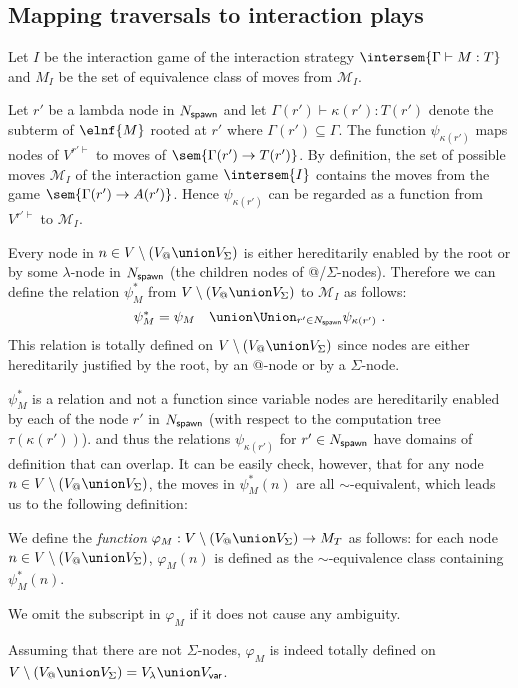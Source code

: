 \subsection{Mapping traversals to interaction plays}

    Let $I$ be the interaction game of the interaction strategy $\intersem{\Gamma \vdash M : T}$ and
    $M_I$ be the set of equivalence class of moves from $\mathcal{M}_I$.

    Let $r'$ be a lambda node in $N_{\sf spawn}$ and let $\Gamma(r') \vdash \kappa(r') : T(r')$ denote the subterm of $\elnf{M}$ rooted at $r'$ where $\Gamma(r')\subseteq \Gamma$.
    The function $\psi_{\kappa(r')}$ maps nodes of $V^{r'\vdash}$
    to moves of $\sem{\Gamma(r') \rightarrow T(r')}$. By definition,
    the set of possible moves $\mathcal{M}_I$ of the interaction game $\intersem{I}$ contains the
    moves from the game $\sem{\Gamma(r') \rightarrow A(r')}$. Hence $\psi_{\kappa(r')}$ can be regarded as a function from $V^{r'\vdash}$ to $\mathcal{M}_I$.

    Every node in $n \in V\setminus (V_@ \union V_\Sigma)$ is either hereditarily enabled by the root or by some $\lambda$-node in $N_{\sf spawn}$ (the children nodes of @/$\Sigma$-nodes). Therefore we can define the relation $\psi^*_M$ from
    $V\setminus (V_@ \union V_\Sigma)$ to $\mathcal{M}_I$ as follows:
    $$ \psi^*_M = \psi_{M} \quad \union \Union_{r' \in N_{\sf spawn}} \psi_{\kappa(r')} \ .$$
    This relation is totally defined on $V\setminus (V_@ \union V_\Sigma)$ since nodes are either hereditarily justified by the root, by an @-node or by a $\Sigma$-node.

    $\psi^*_M$ is a relation and not a function since variable nodes are hereditarily enabled by
    each of the node $r'$ in $N_{\sf spawn}$ (with respect to the computation tree $\tau(\kappa(r'))$).
    and thus the relations $\psi_{\kappa(r')}$ for $r' \in N_{\sf spawn}$ have domains of definition that can overlap.
    It can be easily check, however, that for any node $n \in V\setminus (V_@ \union V_\Sigma)$,
    the moves in $\psi^*_M (n)$ are all $\sim$-equivalent, which leads us to the following definition:
    \begin{definition}
        \label{def:phi mapping}
        We define the \emph{function}
        $\varphi_M:V\setminus (V_@ \union V_\Sigma) \rightarrow M_T$ as follows: for each node $n \in V\setminus (V_@ \union V_\Sigma)$,
        $\varphi_M(n)$ is defined as the $\sim$-equivalence class containing $\psi^*_M (n)$.

        We omit the subscript in $\varphi_M$ if it does not cause any ambiguity.
    \end{definition}
    Assuming that there are not $\Sigma$-nodes, $\varphi_M$ is indeed totally defined on $V \setminus (V_@ \union V_\Sigma) = V_\lambda \union V_{\sf var}$.

